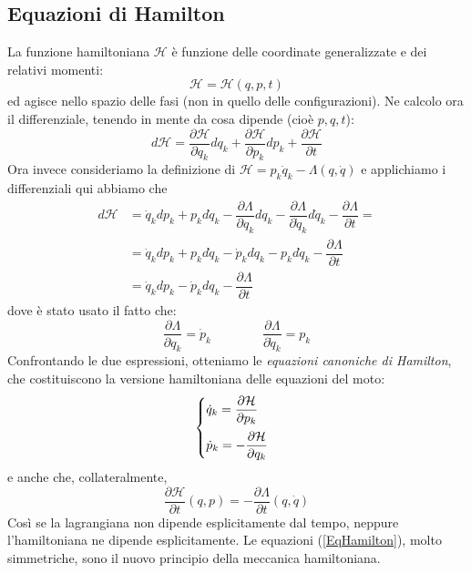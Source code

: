 \documentclass[a4paper,openany]{article}
\begin{document}
	\subsection{Equazioni di Hamilton}
	La funzione hamiltoniana $\mathcal{H}$ è funzione delle coordinate generalizzate e dei relativi momenti:
	$$
	\mathcal{H} = \mathcal{H}(q,p,t)
	$$
	ed agisce nello spazio delle fasi (non in quello delle configurazioni). 
	Ne calcolo ora il differenziale, tenendo in mente da cosa dipende (cioè $p,q,t$):
	\begin{equation}\label{key}
		d\mathcal{H} = \dfrac{\partial \mathcal{H}}{\partial q_k}dq_k +\dfrac{\partial \mathcal{H}}{\partial p_k}dp_k + \dfrac{\partial \mathcal{H}}{\partial t}
	\end{equation}
	Ora invece consideriamo la definizione di $\mathcal{H} = p_k\dot{q}_k  -\Lambda(q,\dot{q})$ e applichiamo i differenziali qui abbiamo che
	\begin{equation}
		\begin{aligned}
			d\mathcal{H} &= \dot{q}_k dp_k + p_k d\dot{q}_k -\dfrac{\partial \Lambda}{\partial q_k}dq_k -\dfrac{\partial \Lambda}{\partial \dot{q}_k}d\dot{q}_k - \dfrac{\partial \Lambda}{\partial t} =\\
			&= \dot{q}_k dp_k + p_k d\dot{q}_k - \dot{p}_k dq_k - p_k d\dot{q}_k - \dfrac{\partial \Lambda}{\partial t} \\
			&= \dot{q}_k dp_k -  \dot{p}_k dq_k - \dfrac{\partial \Lambda}{\partial t} 
		\end{aligned}
	\end{equation}
	dove è stato usato il fatto che:
	$$
	\dfrac{\partial \Lambda}{\partial q_k} = \dot{p}_k   \quad \quad \quad \quad \dfrac{\partial \Lambda}{\partial \dot{q}_k} = p_k
	$$
	Confrontando le due espressioni, otteniamo le \textit{equazioni canoniche di Hamilton}, che costituiscono la versione hamiltoniana delle equazioni del moto:
	\begin{equation}\
		\begin{cases}
			\dot{q}_k = \dfrac{\partial \mathcal{H}}{\partial p_k}\vspace{2mm}   \\
			
			\dot{p}_k = -\dfrac{\partial \mathcal{H}}{\partial q_k}
		\end{cases}
		\label{EqHamilton}
	\end{equation}
	e anche che, collateralmente,
	\begin{equation}\label{key}
		\dfrac{\partial \mathcal{H}}{\partial t}(q,p) = - \dfrac{\partial \Lambda}{\partial t}(q,\dot{q})
	\end{equation}
	Così se la lagrangiana non dipende esplicitamente dal tempo, neppure l'hamiltoniana ne dipende esplicitamente. Le equazioni (\ref{EqHamilton}), molto simmetriche, sono il nuovo principio della meccanica hamiltoniana.
\end{document}
